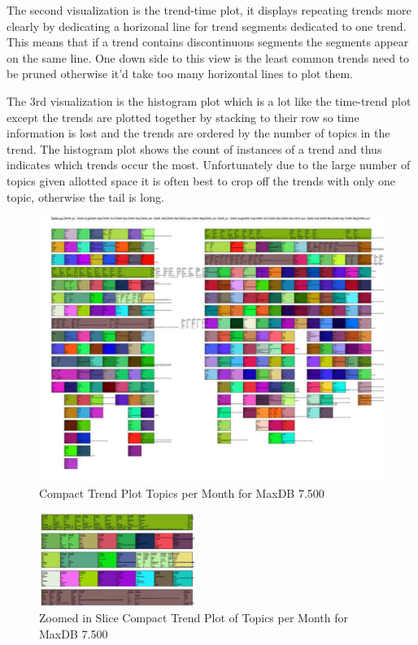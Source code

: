 \documentclass[times, 10pt,twocolumn]{article}
\begin{document}
The second visualization is the trend-time plot, it displays repeating
trends more clearly by dedicating a horizonal line for trend segments
dedicated to one trend. This means that if a trend contains
discontinuous segments the segments appear on the same line. One down
side to this view is the least common trends need to be pruned
otherwise it'd take too many horizontal lines to plot them.

The 3rd visualization is the histogram plot which is a lot like the
time-trend plot except the trends are plotted together by stacking to
their row so time information is lost and the trends are ordered by
the number of topics in the trend. The histogram plot shows the count
of instances of a trend and thus indicates which trends occur the
most. Unfortunately due to the large number of topics given allotted
space it is often best to crop off the trends with only one topic,
otherwise the tail is long.

\begin{figure}
  \centering
  \includegraphics[width=1.0\textwidth]{fixed-time-smear-plot-scaled}
  \caption{Compact Trend Plot Topics per Month for MaxDB 7.500}
  \label{fig:topicsmear}
\end{figure}


\begin{figure}
  \centering
  \includegraphics[width=0.45\textwidth]{fixed-time-smear-plot-cropped}
  \caption{Zoomed in Slice Compact Trend Plot of Topics per Month for MaxDB 7.500}
  \label{fig:zoomedsmear}
\end{figure}
\end{document}
